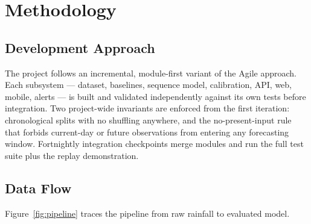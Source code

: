 \documentclass[a4paper,12pt]{report}
\begin{document}
\chapter{Methodology}
\section{Development Approach}
The project follows an incremental, module-first variant of the Agile approach. Each subsystem --- dataset, baselines, sequence model, calibration, API, web, mobile, alerts --- is built and validated independently against its own tests before integration. Two project-wide invariants are enforced from the first iteration: chronological splits with no shuffling anywhere, and the no-present-input rule that forbids current-day or future observations from entering any forecasting window. Fortnightly integration checkpoints merge modules and run the full test suite plus the replay demonstration.

\section{Data Flow}
Figure~\ref{fig:pipeline} traces the pipeline from raw rainfall to evaluated model.
\end{document}
